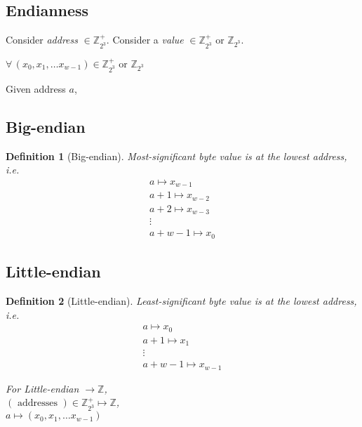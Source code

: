 \documentclass[10pt]{amsart}
\newtheorem{definition}{Definition}
\begin{document}
\begin{multicols*}{2}
\section{Endianness} 

Consider \emph{address} $\in \mathbb{Z}^+_{2^3}$.  Consider a \emph{value} $\in \mathbb{Z}^+_{2^3}$ or $\mathbb{Z}_{2^3}$. 

$\forall \, (x_0, x_1, \dots x_{w-1}) \in \mathbb{Z}^+_{2^3} \text{ or } \mathbb{Z}_{2^3}$

Given address $a$, 

\subsection{Big-endian}

\begin{definition}[Big-endian]
	Most-significant byte value is at the lowest address, i.e. 
	\begin{equation}
	\begin{gathered}
	a \mapsto x_{w-1} \\
	a+1 \mapsto x_{w-2} \\ 
	a+2 \mapsto x_{w-3} \\ 
	\vdots \\
	a+w - 1 \mapsto x_0 
	\end{gathered}
	\end{equation}
	\end{definition} 

\subsection{Little-endian}

\begin{definition}[Little-endian]
Least-significant byte value is at the lowest address, i.e.
\begin{equation}
\begin{gathered}
a \mapsto x_0 \\
a + 1 \mapsto x_1 \\
\vdots \\
a+w - 1 \mapsto x_{w-1}
\end{gathered}
\end{equation}

For Little-endian $\to \mathbb{Z}$, \\
$( \text{ addresses } ) \in \mathbb{Z}^+_{2^3} \mapsto \mathbb{Z}$, \\
$a \mapsto (x_0, x_1, \dots x_{w-1})$


\end{definition}
\end{multicols*}
\end{document}
